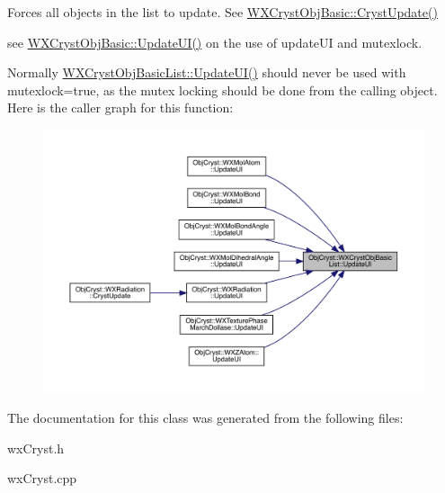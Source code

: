 Forces all objects in the list to update. See \mbox{\hyperlink{class_obj_cryst_1_1_w_x_cryst_obj_basic_a7ac00ae2ae28f1a6fa26e6fa571186b6}{W\+X\+Cryst\+Obj\+Basic\+::\+Cryst\+Update()}}

see \mbox{\hyperlink{class_obj_cryst_1_1_w_x_cryst_obj_basic_a3818940b7031ff7e45cf2178c4a99c90}{W\+X\+Cryst\+Obj\+Basic\+::\+Update\+U\+I()}} on the use of update\+UI and mutexlock.

Normally \mbox{\hyperlink{class_obj_cryst_1_1_w_x_cryst_obj_basic_list_a64a74ecbcfb7a7066e73f0ffdfad2a98}{W\+X\+Cryst\+Obj\+Basic\+List\+::\+Update\+U\+I()}} should never be used with mutexlock=true, as the mutex locking should be done from the calling object. Here is the caller graph for this function\+:
\nopagebreak
\begin{figure}[H]
\begin{center}
\leavevmode
\includegraphics[width=350pt]{class_obj_cryst_1_1_w_x_cryst_obj_basic_list_a64a74ecbcfb7a7066e73f0ffdfad2a98_icgraph}
\end{center}
\end{figure}


The documentation for this class was generated from the following files\+:\begin{DoxyCompactItemize}
\item 
wx\+Cryst.\+h\item 
wx\+Cryst.\+cpp\end{DoxyCompactItemize}
